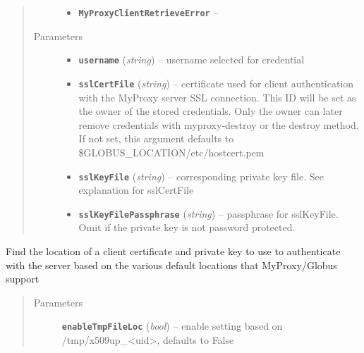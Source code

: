 \documentclass[letterpaper,10pt,english]{sphinxmanual}
\begin{document}
\begin{fulllineitems}
\begin{fulllineitems}
\begin{quote}
\begin{description}
\begin{itemize}
\item {} 
\textbf{\texttt{MyProxyClientRetrieveError}} -- 

\end{itemize}

\item[{Parameters}] \leavevmode\begin{itemize}
\item {} 
\textbf{\texttt{username}} (\emph{string}) -- username selected for credential

\item {} 
\textbf{\texttt{sslCertFile}} (\emph{string}) -- certificate used for client authentication with the MyProxy server SSL connection.  This ID will be set as the owner of the stored credentials.  Only the owner can later remove credentials with myproxy-destroy or the destroy method.  If not set, this argument defaults to \$GLOBUS\_LOCATION/etc/hostcert.pem

\item {} 
\textbf{\texttt{sslKeyFile}} (\emph{string}) -- corresponding private key file.  See explanation for sslCertFile

\item {} 
\textbf{\texttt{sslKeyFilePassphrase}} (\emph{string}) -- passphrase for sslKeyFile.  Omit if the private key is not password protected.

\end{itemize}

\end{description}\end{quote}

\end{fulllineitems}


\begin{fulllineitems}
\label{client:myproxy.client.MyProxyClient.locateClientCredentials}
Find the location of a client certificate and private key to use to 
authenticate with the server based on the various default locations
that MyProxy/Globus support
\begin{quote}\begin{description}
\item[{Parameters}] \leavevmode
\textbf{\texttt{enableTmpFileLoc}} (\emph{bool}) -- enable setting based on /tmp/x509up\_\textless{}uid\textgreater{}, defaults to False


\end{description}
\end{quote}
\end{fulllineitems}
\end{fulllineitems}
\end{document}
